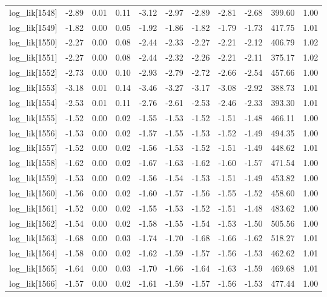 \begin{table}[ht]
\begin{tabular}{rrrrrrrrrrr}
  log\_lik[1548] & -2.89 & 0.01 & 0.11 & -3.12 & -2.97 & -2.89 & -2.81 & -2.68 & 399.60 & 1.00 \\ 
  log\_lik[1549] & -1.82 & 0.00 & 0.05 & -1.92 & -1.86 & -1.82 & -1.79 & -1.73 & 417.75 & 1.01 \\ 
  log\_lik[1550] & -2.27 & 0.00 & 0.08 & -2.44 & -2.33 & -2.27 & -2.21 & -2.12 & 406.79 & 1.02 \\ 
  log\_lik[1551] & -2.27 & 0.00 & 0.08 & -2.44 & -2.32 & -2.26 & -2.21 & -2.11 & 375.17 & 1.02 \\ 
  log\_lik[1552] & -2.73 & 0.00 & 0.10 & -2.93 & -2.79 & -2.72 & -2.66 & -2.54 & 457.66 & 1.00 \\ 
  log\_lik[1553] & -3.18 & 0.01 & 0.14 & -3.46 & -3.27 & -3.17 & -3.08 & -2.92 & 388.73 & 1.01 \\ 
  log\_lik[1554] & -2.53 & 0.01 & 0.11 & -2.76 & -2.61 & -2.53 & -2.46 & -2.33 & 393.30 & 1.01 \\ 
  log\_lik[1555] & -1.52 & 0.00 & 0.02 & -1.55 & -1.53 & -1.52 & -1.51 & -1.48 & 466.11 & 1.00 \\ 
  log\_lik[1556] & -1.53 & 0.00 & 0.02 & -1.57 & -1.55 & -1.53 & -1.52 & -1.49 & 494.35 & 1.00 \\ 
  log\_lik[1557] & -1.52 & 0.00 & 0.02 & -1.56 & -1.53 & -1.52 & -1.51 & -1.49 & 448.62 & 1.01 \\ 
  log\_lik[1558] & -1.62 & 0.00 & 0.02 & -1.67 & -1.63 & -1.62 & -1.60 & -1.57 & 471.54 & 1.00 \\ 
  log\_lik[1559] & -1.53 & 0.00 & 0.02 & -1.56 & -1.54 & -1.53 & -1.51 & -1.49 & 453.82 & 1.00 \\ 
  log\_lik[1560] & -1.56 & 0.00 & 0.02 & -1.60 & -1.57 & -1.56 & -1.55 & -1.52 & 458.60 & 1.00 \\ 
  log\_lik[1561] & -1.52 & 0.00 & 0.02 & -1.55 & -1.53 & -1.52 & -1.51 & -1.48 & 483.62 & 1.00 \\ 
  log\_lik[1562] & -1.54 & 0.00 & 0.02 & -1.58 & -1.55 & -1.54 & -1.53 & -1.50 & 505.56 & 1.00 \\ 
  log\_lik[1563] & -1.68 & 0.00 & 0.03 & -1.74 & -1.70 & -1.68 & -1.66 & -1.62 & 518.27 & 1.01 \\ 
  log\_lik[1564] & -1.58 & 0.00 & 0.02 & -1.62 & -1.59 & -1.57 & -1.56 & -1.53 & 462.62 & 1.01 \\ 
  log\_lik[1565] & -1.64 & 0.00 & 0.03 & -1.70 & -1.66 & -1.64 & -1.63 & -1.59 & 469.68 & 1.01 \\ 
  log\_lik[1566] & -1.57 & 0.00 & 0.02 & -1.61 & -1.59 & -1.57 & -1.56 & -1.53 & 477.44 & 1.00 \\ 

\end{tabular}
\end{table}
